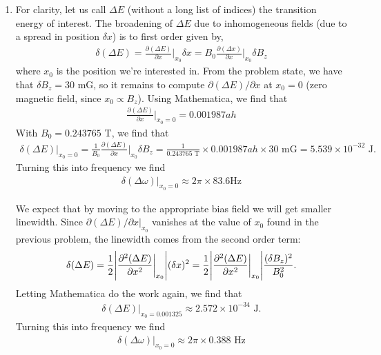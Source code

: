 \documentclass{article}
\theoremstyle{definition}
\newcommand{\p}{\partial}
\newcommand{\f}[2]{\frac{#1}{#2}}
\begin{document}
\begin{enumerate}[label=(\alph*)]
	\item For clarity, let us call $\Delta E$ (without a long list of indices) the transition energy of interest. The broadening of $\Delta E$ due to inhomogeneous fields (due to a spread in position $\delta x$) is to first order given by,  
	\begin{align*}
	\delta (\Delta E) = \f{\p (\Delta E)}{\p x}\bigg\vert_{x_0} \delta x = B_0\f{\p(\Delta x)}{\p x}\bigg\vert_{x_0}\delta B_z
	\end{align*}
	where $x_0$ is the position we're interested in. From the problem state, we have that $\delta B_z = 30 $ mG, so it remains to compute $\p (\Delta E)/\p x$ at $x_0 = 0$ (zero magnetic field, since $x_0 \propto B_z$). Using Mathematica, we find that
	\begin{align*}
	\f{\p (\Delta E)}{\p x}\bigg\vert_{x_0=0} = 0.001987ah 
	\end{align*}
	With $B_0 = 0.243765$ T, we find that
	\begin{align*}
	\delta (\Delta E)\bigg\vert_{x_0=0} = \f{1}{B_0}\f{\p(\Delta E)}{\p x}\bigg\vert_{x_0}\delta B_z = \f{1}{0.243765 \text{ T}} \times  0.001987ah  \times 30 \text{ mG} = 5.539 \times 10^{-32} \text{ J}.
	\end{align*}
	Turning this into frequency  we find 
	\begin{align*}
	\delta (\Delta \omega)\bigg\vert_{x_0=0} \approx \boxed{2\pi \times 83.6 \text{Hz}}
	\end{align*}
	
	We expect that by moving to the appropriate bias field we will get smaller linewidth. Since $\p(\Delta E)/\p x\vert_{x_0}$ vanishes at the value of $x_0$ found in the previous problem, the linewidth comes from the second order term:
	\begin{align*}
	\delta (\Delta E) = \f{1}{2}\abs{\f{\p^2 (\Delta E)}{\p x^2}\bigg\vert_{x_0}} (\delta x)^2 = \f{1}{2}\abs{\f{\p^2 (\Delta E)}{\p x^2}\bigg\vert_{x_0}} \f{(\delta B_z)^2}{B_0^2}.
	\end{align*}
	Letting Mathematica do the work again, we find that
	\begin{align*}
	\delta (\Delta E)\bigg\vert_{x_0=0.001325} \approx 2.572 \times 10^{-34} \text{ J}.
	\end{align*}
	Turning this into frequency we find 
	\begin{align*}
	\delta (\Delta \omega)\bigg\vert_{x_0=0} \approx \boxed{2\pi \times 0.388 \text{ Hz}}
	\end{align*}
	
	
\end{enumerate}
\end{document}
